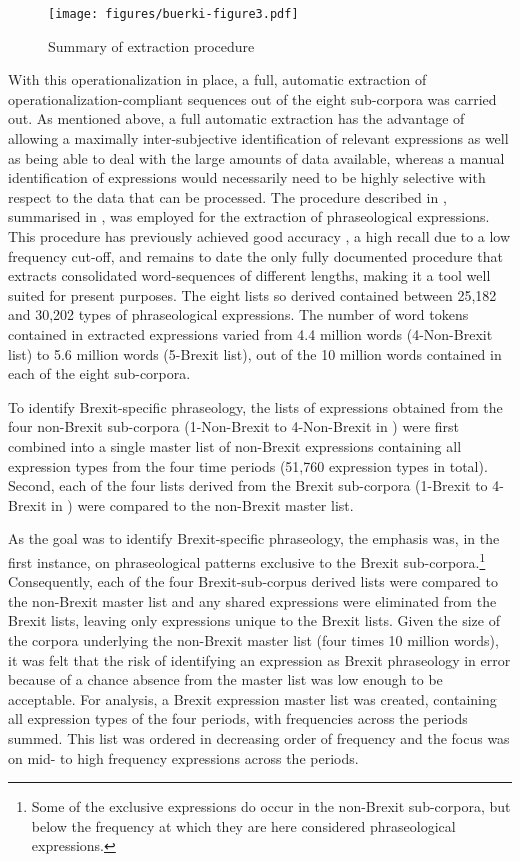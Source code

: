 \documentclass[output=paper]{langscibook}
\begin{document}
  
\begin{figure}
\texttt{[image: figures/buerki-figure3.pdf]}
\caption{Summary of extraction procedure\label{fig:buerki:3}}
\end{figure}

With this operationalization in place, a full, automatic extraction of operational\-i\-zation-compliant sequences out of the eight sub-corpora was carried out. As mentioned above, a full automatic extraction has the advantage of allowing a maximally inter-subjective identification of relevant expressions as well as being able to deal with the large amounts of data available, whereas a manual identification of expressions would necessarily need to be highly selective with respect to the data that can be processed. The procedure described in \citet{Buerki2016}, summarised in , was employed for the extraction of phraseological expressions. This procedure has previously achieved good accuracy \citep[23]{Buerki2016}, a high recall due to a low frequency cut-off, and remains to date the only fully documented procedure that extracts consolidated word-sequences of different lengths, making it a tool well suited for present purposes. The eight lists so derived contained between 25,182 and 30,202 types of phraseological expressions. The number of word tokens contained in extracted expressions varied from 4.4 million words (4-Non-Brexit list) to 5.6 million words (5-Brexit list), out of the 10 million words contained in each of the eight sub-corpora.

To identify Brexit-specific phraseology, the lists of expressions obtained from the four non-Brexit sub-corpora (1-Non-Brexit to 4-Non-Brexit in ) were first combined into a single master list of non-Brexit expressions containing all expression types from the four time periods (51,760 expression types in total). Second, each of the four lists derived from the Brexit sub-corpora (1-Brexit to 4-Brexit in ) were compared to the non-Brexit master list.

As the goal was to identify Brexit-specific phraseology, the emphasis was, in the first instance, on phraseological patterns exclusive to the Brexit sub-corpora.\footnote{Some of the exclusive expressions do occur in the non-Brexit sub-corpora, but below the frequency at which they are here considered phraseological expressions.} Consequently, each of the four Brexit-sub-corpus derived lists were compared to the non-Brexit master list and any shared expressions were eliminated from the Brexit lists, leaving only expressions unique to the Brexit lists. Given the size of the corpora underlying the non-Brexit master list (four times 10 million words), it was felt that the risk of identifying an expression as Brexit phraseology in error because of a chance absence from the master list was low enough to be acceptable. For analysis, a Brexit expression master list was created, containing all expression types of the four periods, with frequencies across the periods summed. This list was ordered in decreasing order of frequency and the focus was on mid- to high frequency expressions across the periods.
\end{document}
